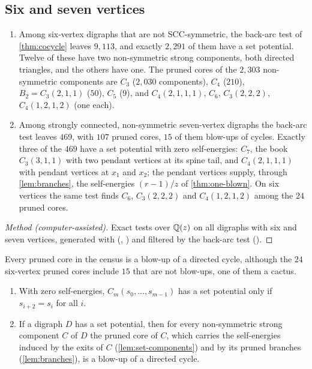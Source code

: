 \subsection{Six and seven vertices}

\begin{proposition}\label{prop:census67}
\begin{enumerate}[label=\textup{(\arabic*)}]
\item Among six-vertex digraphs that are not SCC-symmetric, the back-arc test of \cref{thm:cocycle} leaves $9{,}113$, and exactly $2{,}291$ of them have a set potential. Twelve of these have two non-symmetric strong components, both directed triangles, and the others have one. The pruned cores of the $2{,}303$ non-symmetric components are $C_3$ ($2{,}030$ components), $C_4$ ($210$), $B_2=C_3(2,1,1)$ ($50$), $C_5$ ($9$), and $C_4(2,1,1,1)$, $C_6$, $C_3(2,2,2)$, $C_4(1,2,1,2)$ (one each).
\item Among strongly connected, non-symmetric seven-vertex digraphs the back-arc test leaves $469$, with $107$ pruned cores, $15$ of them blow-ups of cycles. Exactly three of the $469$ have a set potential with zero self-energies: $C_7$, the book $C_3(3,1,1)$ with two pendant vertices at its spine tail, and $C_4(2,1,1,1)$ with pendant vertices at $x_1$ and $x_2$; the pendant vertices supply, through \cref{lem:branches}, the self-energies $(r-1)/z$ of \cref{thm:one-blown}. On six vertices the same test finds $C_6$, $C_3(2,2,2)$ and $C_4(1,2,1,2)$ among the $24$ pruned cores.
\end{enumerate}
\end{proposition}
\begin{proof}[Method \textup{(computer-assisted)}]
Exact tests over $\mathbb{Q}(z)$ on all digraphs with six and seven vertices, generated with  (, ) and filtered by the back-arc test ().
\end{proof}

Every pruned core in the census is a blow-up of a directed cycle, although the $24$ six-vertex pruned cores include $15$ that are not blow-ups, one of them a cactus.

\begin{conjecture}\label{conj:blowups}
\begin{enumerate}[label=\textup{(\arabic*)}]
\item With zero self-energies, $C_m(s_0,\dots,s_{m-1})$ has a set potential only if $s_{i+2}=s_i$ for all $i$.
\item If a digraph $D$ has a set potential, then for every non-symmetric strong component $C$ of $D$ the pruned core of $C$, which carries the self-energies induced by the exits of $C$ (\cref{lem:set-components}) and by its pruned branches (\cref{lem:branches}), is a blow-up of a directed cycle.
\end{enumerate}
\end{conjecture}

